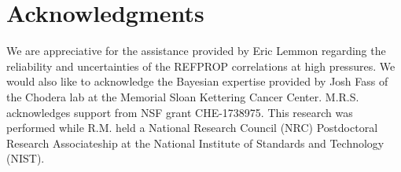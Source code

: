 \documentclass[preprint,letterpaper,floatfix,citeautoscript,aip,jcp]{revtex4-1}
\begin{document}
\section*{Acknowledgments}

We are appreciative for the assistance provided by Eric Lemmon regarding the reliability and uncertainties of the REFPROP correlations at high pressures. We would also like to acknowledge the Bayesian expertise provided by Josh Fass of the Chodera lab at the Memorial Sloan Kettering Cancer Center. M.R.S. acknowledges support from NSF grant CHE-1738975. This research was performed while R.M. held a National Research Council (NRC) Postdoctoral Research Associateship at the National Institute of Standards and Technology (NIST).



\end{document}
